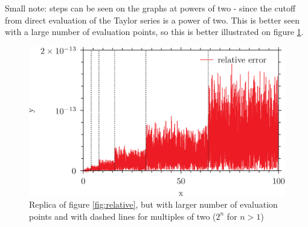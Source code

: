 \documentclass{article}
\begin{document}
Small note: steps can be seen on the graphs at powers of two - since the cutoff from direct evaluation of the Taylor series is a power of two. This is better seen with a large number of evaluation points, so this is better illustrated on figure \ref{fig:largeN}.
\begin{figure}[h]
	\includegraphics{plot5.png}
	\caption{Replica of figure \ref{fig:relative}, but with larger number of evaluation points and with dashed lines for multiples of two ($2^n$ for $ n>1 $)}
	\label{fig:largeN}
\end{figure}
\end{document}

